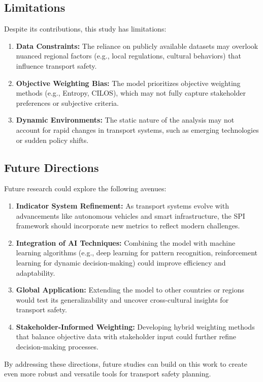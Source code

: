 \documentclass{article}
\begin{document}
\subsection{Limitations}
Despite its contributions, this study has limitations:
\begin{enumerate}
\item \textbf{Data Constraints:} The reliance on publicly available datasets may overlook nuanced regional factors (e.g., local regulations, cultural behaviors) that influence transport safety.
\item \textbf{Objective Weighting Bias:} The model prioritizes objective weighting methods (e.g., Entropy, CILOS), which may not fully capture stakeholder preferences or subjective criteria.
\item \textbf{Dynamic Environments:} The static nature of the analysis may not account for rapid changes in transport systems, such as emerging technologies or sudden policy shifts.
\end{enumerate}

\subsection{Future Directions}
Future research could explore the following avenues:
\begin{enumerate}
\item \textbf{Indicator System Refinement:} As transport systems evolve with advancements like autonomous vehicles and smart infrastructure, the SPI framework should incorporate new metrics to reflect modern challenges.
\item \textbf{Integration of AI Techniques:} Combining the model with machine learning algorithms (e.g., deep learning for pattern recognition, reinforcement learning for dynamic decision-making) could improve efficiency and adaptability.
\item \textbf{Global Application:} Extending the model to other countries or regions would test its generalizability and uncover cross-cultural insights for transport safety.
\item \textbf{Stakeholder-Informed Weighting:} Developing hybrid weighting methods that balance objective data with stakeholder input could further refine decision-making processes.
\end{enumerate}
By addressing these directions, future studies can build on this work to create even more robust and versatile tools for transport safety planning.
\end{document}
